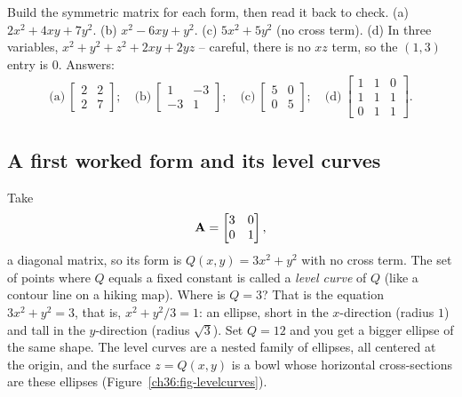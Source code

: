 \begin{labbox}
Build the symmetric matrix for each form, then read it back to check.
(a) $2x^2 + 4xy + 7y^2$. (b) $x^2 - 6xy + y^2$. (c) $5x^2 + 5y^2$ (no cross term).
(d) In three variables, $x^2 + y^2 + z^2 + 2xy + 2yz$ -- careful, there is no $xz$
term, so the $(1,3)$ entry is $0$. Answers:
\begin{align*}
  \text{(a)}~\begin{bmatrix}2&2\\2&7\end{bmatrix}; \quad
  \text{(b)}~\begin{bmatrix}1&-3\\-3&1\end{bmatrix}; \quad
  \text{(c)}~\begin{bmatrix}5&0\\0&5\end{bmatrix}; \quad
  \text{(d)}~\begin{bmatrix}1&1&0\\1&1&1\\0&1&1\end{bmatrix}.
\end{align*}
\end{labbox}

\subsection{A first worked form and its level curves}

Take
\[
  \mathbf{A}=\begin{bmatrix}3&0\\0&1\end{bmatrix},
\]
a diagonal matrix, so its form
is $Q(x,y)=3x^2+y^2$ with no cross term. The set of points where $Q$ equals a fixed
constant is called a \emph{level curve} of $Q$ (like a contour line on a hiking map).
Where is $Q=3$? That is the equation $3x^2+y^2=3$, that is, $x^2 + y^2/3 = 1$: an ellipse,
short in the $x$-direction (radius $1$) and tall in the $y$-direction (radius
$\sqrt 3$). Set $Q=12$ and you get a bigger ellipse of the same shape. The level
curves are a nested family of ellipses, all centered at the origin, and the surface
$z=Q(x,y)$ is a bowl whose horizontal cross-sections are these ellipses
(Figure~\ref{ch36:fig-levelcurves}).

